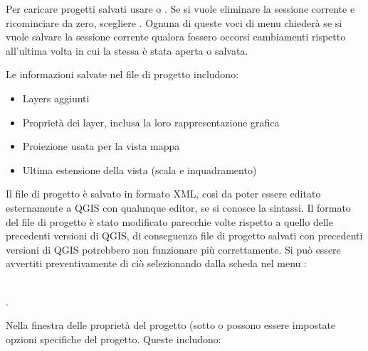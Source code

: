 Per caricare progetti salvati usare  \arrow
{}
o  \arrow {}.
Se si vuole eliminare la sessione corrente e ricominciare da zero, scegliere
 \arrow {}.
Ognuna di queste voci di menu chiederà se si vuole salvare la sessione
corrente qualora fossero occorsi cambiamenti rispetto all'ultima volta in cui la stessa è
stata aperta o salvata.

Le informazioni salvate nel file di progetto includono:

\begin{itemize}
\item Layers aggiunti
\item Proprietà dei layer, inclusa la loro rappresentazione grafica
\item Proiezione usata per la vista mappa
\item Ultima estensione della vista (scala e inquadramento)
\end{itemize}

Il file di progetto è salvato in formato XML, così da poter essere editato
esternamente a QGIS con qualunque editor, se si conosce la sintassi. Il formato
del file di progetto è stato modificato parecchie volte rispetto a quello
delle precedenti versioni di QGIS, di conseguenza file di progetto salvati con
precedenti versioni di QGIS potrebbero non funzionare più correttamente. Si
può essere avvertiti preventivamente di ciò selezionando dalla scheda
 nel menu  \arrow {}: 

 \\
.

Nella finestra delle proprietà del progetto (sotto  o  possono essere impostate opzioni specifiche del progetto. Queste
includono:

